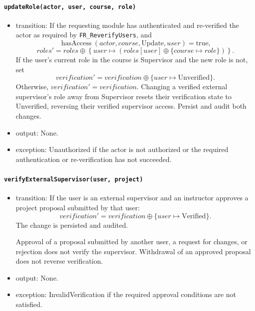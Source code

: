 \documentclass[12pt, titlepage]{article}
\begin{document}
\paragraph{\texttt{updateRole(actor, user, course, role)}}
\begin{itemize}
    \item transition: If the requesting module has authenticated and re-verified the actor as required by \texttt{FR\_ReverifyUsers}, and
    \[
    \operatorname{hasAccess}(actor,course,\text{Update},user)=\text{true},
    \]
    \[
    \mathit{roles}' =
    \mathit{roles}\oplus
    \left\{
    user\mapsto
    \left(
    \mathit{roles}[user]\oplus
    \{course\mapsto role\}
    \right)
    \right\}.
    \]
    If the user's current role in the course is Supervisor and the new role is not, set
    \[
    \mathit{verification}'=\mathit{verification}\oplus\{user\mapsto\text{Unverified}\}.
    \]
    Otherwise, $\mathit{verification}'=\mathit{verification}$.
    Changing a verified external supervisor's role away from Supervisor resets their verification state to Unverified, reversing their verified supervisor access. Persist and audit both changes.

    \item output: None.

    \item exception: Unauthorized if the actor is not authorized or the required authentication or re-verification has not succeeded.
\end{itemize}

\paragraph{\texttt{verifyExternalSupervisor(user, project)}}
\begin{itemize}
    \item transition: If the user is an external supervisor and an instructor approves a project proposal submitted by that user:
    \[
    \mathit{verification}' =
    \mathit{verification}\oplus
    \{user\mapsto\text{Verified}\}.
    \]
    The change is persisted and audited.

    Approval of a proposal submitted by another user, a request for changes, or rejection does not verify the supervisor. Withdrawal of an approved proposal does not reverse verification.

    \item output: None.

    \item exception: InvalidVerification if the required approval conditions are not satisfied.
\end{itemize}
\end{document}
